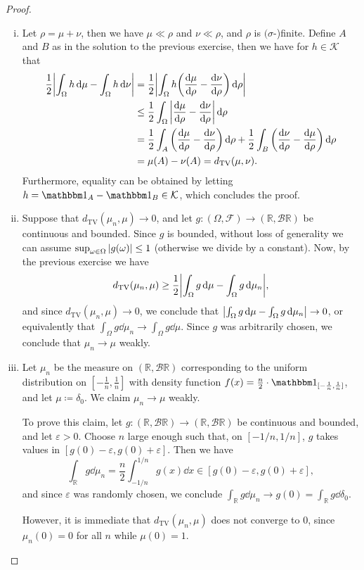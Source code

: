\documentclass{article}
\theoremstyle{plain}
\theoremstyle{remark}
\renewcommand{\epsilon}{\varepsilon}
\newcommand{\Bb}{\mathbb}
\newcommand{\Cal}{\mathcal}
\newcommand{\Rm}{\mathrm}
\newcommand{\RR}{\Bb R}
\newcommand\ceq\coloneqq %
\newcommand\eps\epsilon
\newcommand\ind{\mathbbm 1} %
\newcommand\KK{\Cal K}
\newcommand\BB{\Cal B}
\newcommand\FF{\Cal F}
\begin{document}
\begin{proof}
\begin{enumerate}[(i)]
\item Let $\rho = \mu + \nu$, then we have $\mu \ll\rho$ and $\nu \ll \rho$, and $\rho$ is $(\sigma$-)finite. Define $A$ and $B$ as in the solution to the previous exercise, then we have for $h \in \KK$ that
\begin{align*}
	\frac12 \abs{\int_\Omega h \dd{\mu} - \int_\Omega h \dd{\nu}} &= \frac12 \abs{\int_\Omega h\qty(\dv{\mu}{\rho} - \dv{\nu}{\rho}) \dd{\rho}} \\
	&\leq \frac12 \int_\Omega \abs{\dv{\mu}{\rho} - \dv{\nu}{\rho}}\dd{\rho} \\
	&= \frac12 \int_A \qty(\dv{\mu}{\rho} - \dv{\nu}{\rho}) \dd{\rho} + \frac12 \int_B \qty(\dv{\nu}{\rho} - \dv{\mu}{\rho}) \dd{\rho} \\
	&= \mu(A) - \nu(A) = d_\Rm{TV}(\mu, \nu). 
\end{align*}
Furthermore, equality can be obtained by letting $h = \ind_A - \ind_B \in \KK$, which concludes the proof. 

\item Suppose that $d_\Rm{TV}(\mu_n, \mu) \to 0$, and let $g \colon (\Omega, \FF) \to (\RR, \BB\RR)$ be continuous and bounded. Since $g$ is bounded, without loss of generality we can assume $\sup_{\omega \in \Omega} \abs{g(\omega)} \leq 1$ (otherwise we divide by a constant). Now, by the previous exercise we have
\[
d_\Rm{TV}(\mu_n, \mu) \geq \frac12 \abs{\int_\Omega g \dd{\mu} - \int_\Omega g \dd{\mu_n}}, 
\] 
and since $d_\Rm{TV}(\mu_n, \mu) \to 0$, we conclude that $\abs{\int_\Omega g \dd{\mu} - \int_\Omega g \dd{\mu_n}} \to 0$, or equivalently that $\int_\Omega g \dd{\mu_n} \to \int_\Omega g \dd{\mu}$. Since $g$ was arbitrarily chosen, we conclude that $\mu_n \to \mu$ weakly. 

\item Let $\mu_n$ be the measure on $(\RR, \BB\RR)$ corresponding to the uniform distribution on $[-\frac1n, \frac1n]$ with density function $f(x) = \frac n2 \cdot  \ind_{[-\frac1n, \frac1n]}$, and let $\mu \ceq \delta_0$. We claim $\mu_n \to \mu$ weakly. 

To prove this claim, let $g \colon (\RR, \BB\RR) \to (\RR, \BB\RR)$ be continuous and bounded, and let $\eps > 0$. Choose $n$ large enough such that, on $[-1/n, 1/n]$, $g$ takes values in $[g(0) - \eps, g(0) + \eps]$. Then we have 
\[
\int_\RR g \dd{\mu_n} = \frac n2 \int_{-1/n}^{1/n} g(x) \dd{x} \in [g(0) - \eps, g(0) + \eps], 
\]
and since $\eps$ was randomly chosen, we conclude $\int_\RR g \dd{\mu_n} \to g(0) = \int_\RR g \dd{\delta_0}$. 

However, it is immediate that $d_\Rm{TV}(\mu_n, \mu)$ does not converge to 0, since $\mu_n(\qty{0}) = 0$ for all $n$ while $\mu(\qty{0}) = 1$. 
	\end{enumerate}
\end{proof}
\end{document}
